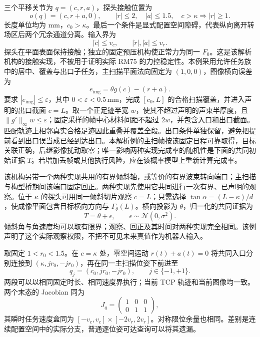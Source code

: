 \documentclass[UTF8,fontset=fandol,zihao=5,a4paper]{ctexart}
\theoremstyle{definition}
\theoremstyle{remark}\newtheorem{remark}[theorem]{说明}
\numberwithin{equation}{section}
\begin{document}
三个平移关节为 \(q=(c,r,a)\)，探头接触位置为
\begin{equation}
o(q)=(c,r+a,0),\qquad
|r|\le2,\quad |a|\le1.5,
\quad c>\kappa\Longrightarrow |r|\ge1.
\label{eq:example-geometry}
\end{equation}
长度单位均为 \(\mathrm{mm}\)，\(c_0>\kappa\)。最后一个条件是显式配置空间障碍，代表纵向离开转场区后两个冗余通道分离。输入界为
\begin{equation}
|\dot c|\le v_c,\qquad |\dot r|,|\dot a|\le v_r.
\label{eq:example-speed}
\end{equation}
探头在平面表面保持接触；独立的固定预压机构使正常力为同一 \(F_0\)。这是该解析机构的接触实现，不被用于证明实际 RM75 的力控稳定性。本例采用允许任务族中的居中、覆盖与出口子任务，主扫描平面法向固定为 \((1,0,0)\)，图像横向误差为
\begin{equation}
e_{\mathrm{img}}=\theta g(c)-(r+a).
\label{eq:example-image}
\end{equation}
要求 \(|e_{\mathrm{img}}|\le\varepsilon\)，其中 \(0<\varepsilon<0.5\,\mathrm{mm}\)，完成 \([c_0,L]\) 的合格扫描覆盖，并进入声明的出口截面 \(c=L\)。取一个正足迹半宽 \(w\)，使其不超过声明的声束半厚度，且 \(\|g'\|_\infty w\le\varepsilon\)；固定采样的帧中心材料间距不超过 \(2w\)，并包含入口和出口截面。匹配轨迹上相邻真实合格足迹因此重叠并覆盖全段。出口条件单独保留，避免把提前看到出口误当成已经到达出口。本解析例的主扫帧按该固定日程可靠取得，目标关联正确，后继影像扰动取零；唯一影响两种实现完成率的随机性是下面的共同初始证据 \(T\)。若增加丢帧或其他执行风险，应在该概率模型上重新计算完成率。

该机构另带一个两种实现共用的有界倾斜轴，或等价的有界波束转向端口；主扫描与构型桥期间该端口固定回正。两种实现先使用它共同进行一次有界、已声明的观察。位于 \(\kappa\) 的探头可用同一倾斜切片观察 \(c=L\)；只需选择 \(\tan\alpha=(L-\kappa)/d\)，使成像平面包含目标横向方向与 \(\Gamma_\theta(L)\)。横向投影为 \(\theta\)，归一化的共同证据为
\begin{equation}
T=\theta+\epsilon,\qquad\epsilon\sim\mathcal N(0,\sigma^2).
\label{eq:example-evidence}
\end{equation}
倾斜角与角速度均可以取有限界；观察、回正及其时间对两种实现完全相同。该例声明了这个实际观察权限，不把不可见未来真值作为机器人输入。

取固定 \(1<r_0<1.5\)。在 \(c=\kappa\) 处，零空间运动 \(r(t)+a(t)=0\) 将共同入口分别连接到 \((\kappa,jr_0,-jr_0)\)，再在同一主扫描位姿下前进至
\begin{equation}
q_j=(c_0,jr_0,-jr_0),\qquad j\in\{-1,+1\}.
\label{eq:example-branches}
\end{equation}
两段可以以相同固定时长、相同速度界执行；当前 TCP 轨迹和当前图像均一致。两个末态的 Jacobian 同为
\[
J_q=\begin{pmatrix}1&0&0\\0&1&1\end{pmatrix},
\]
其瞬时任务速度盒同为 \([-v_c,v_c]\times[-2v_r,2v_r]\)。对称限位余量也相同。差别是连续配置空间中的实际分支，普通逐位姿可达查询可以将其遗漏。
\end{document}
